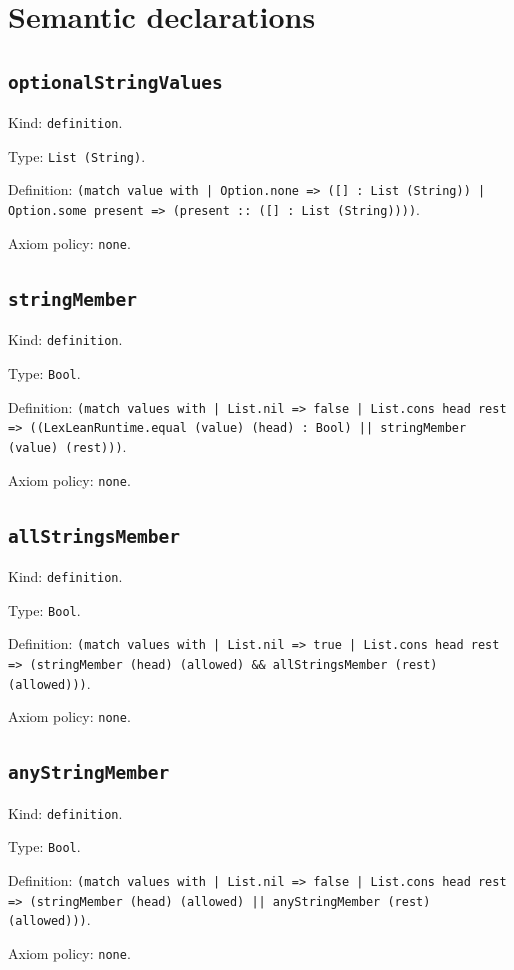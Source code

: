 \documentclass[11pt]{article}
\begin{document}
\section*{Semantic declarations}
\subsection*{\texttt{optionalStringValues}}
\noindent Kind: \texttt{definition}.\par
\noindent Type: \texttt{List (String)}.\par
\noindent Definition: \texttt{(match value with | Option.none => ([] : List (String)) | Option.some present => (present :: ([] : List (String))))}.\par
\noindent Axiom policy: \texttt{none}.\par
\subsection*{\texttt{stringMember}}
\noindent Kind: \texttt{definition}.\par
\noindent Type: \texttt{Bool}.\par
\noindent Definition: \texttt{(match values with | List.nil => false | List.cons head rest => ((LexLeanRuntime.equal (value) (head) : Bool) || stringMember (value) (rest)))}.\par
\noindent Axiom policy: \texttt{none}.\par
\subsection*{\texttt{allStringsMember}}
\noindent Kind: \texttt{definition}.\par
\noindent Type: \texttt{Bool}.\par
\noindent Definition: \texttt{(match values with | List.nil => true | List.cons head rest => (stringMember (head) (allowed) \&\& allStringsMember (rest) (allowed)))}.\par
\noindent Axiom policy: \texttt{none}.\par
\subsection*{\texttt{anyStringMember}}
\noindent Kind: \texttt{definition}.\par
\noindent Type: \texttt{Bool}.\par
\noindent Definition: \texttt{(match values with | List.nil => false | List.cons head rest => (stringMember (head) (allowed) || anyStringMember (rest) (allowed)))}.\par
\noindent Axiom policy: \texttt{none}.\par
\end{document}
